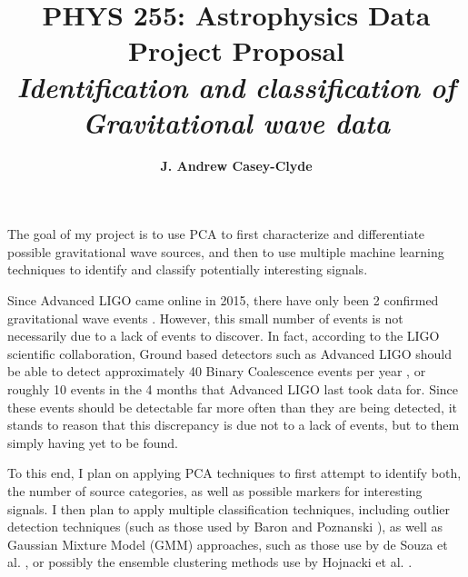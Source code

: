 \documentclass[11pt]{article}
\begin{document}
\title{\bf{PHYS 255: Astrophysics Data Project Proposal}\\
\it{Identification and classification of Gravitational wave data}}
\author{\bf{J. Andrew Casey-Clyde}}
\maketitle

The goal of my project is to use PCA to first characterize and differentiate possible gravitational wave sources, and then to use multiple machine learning techniques to identify and classify potentially interesting signals.

Since Advanced LIGO came online in 2015, there have only been 2 confirmed gravitational wave events \cite{TheLIGOScientificCollaboration2016} \cite{Abbott2016}. However, this small number of events is not necessarily due to a lack of events to discover. In fact, according to the LIGO scientific collaboration, Ground based detectors such as Advanced LIGO should be able to detect approximately 40 Binary Coalescence events per year \cite{LIGOScientificCollaboration2010}, or roughly 10 events in the 4 months that Advanced LIGO last took data for. Since these events should be detectable far more often than they are being detected, it stands to reason that this discrepancy is due not to a lack of events, but to them simply having yet to be found.

To this end, I plan on applying PCA techniques to first attempt to identify both, the number of source categories, as well as possible markers for interesting signals. I then plan to apply multiple classification techniques, including outlier detection techniques (such as those used by Baron and Poznanski \cite{Baron2016}), as well as Gaussian Mixture Model (GMM) approaches, such as those use by de Souza et al. \cite{DeSouza2017}, or possibly the ensemble clustering methods use by Hojnacki et al. \cite{Hojnacki2008}.



\end{document}
